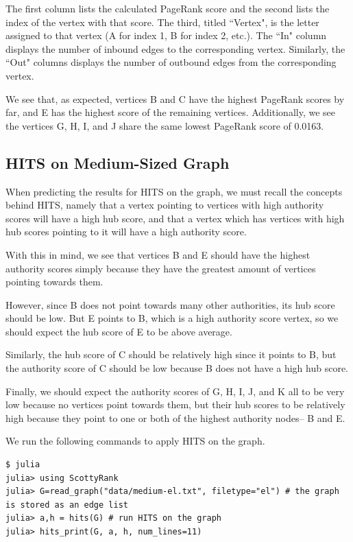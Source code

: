 \documentclass[12pt, titlepage, twoside]{amsart}
\begin{document}
The first column lists the calculated PageRank score and
the second lists the index of the vertex with that score.
The third, titled ``Vertex", is the letter assigned to that vertex (A for index 1, B for index 2, etc.).
The ``In" column displays the number of inbound edges to the corresponding vertex.
Similarly, the ``Out" columns displays the number of outbound edges from the corresponding vertex.

We see that, as expected, vertices B and C have the highest PageRank scores by far,
and E has the highest score of the remaining vertices.
Additionally, we see the vertices G, H, I, and J share the same lowest PageRank score of 0.0163.

\subsection{HITS on Medium-Sized Graph}

When predicting the results for HITS on the graph, we must recall the concepts behind HITS, namely
that a vertex pointing to vertices with high authority scores will have a high hub score,
and that a vertex which has vertices with high hub scores pointing to it will have a high authority score.

With this in mind, we see that vertices B and E should have the highest authority scores
simply because they have the greatest amount of vertices pointing towards them.

However, since B does not point towards many other authorities, its hub score should be low.
But E points to B, which is a high authority score vertex, so we should expect 
the hub score of E to be above average.

Similarly, the hub score of C should be relatively high since it points to B, but the authority score of C should be low because B does not have a high hub score.

Finally, we should expect the authority scores of G, H, I, J, and K all to be very low
because no vertices point towards them,
but their hub scores to be relatively high because they point to
one or both of the highest authority nodes-- B and E.

We run the following commands to apply HITS on the graph.

\begin{verbatim}
$ julia
julia> using ScottyRank
julia> G=read_graph("data/medium-el.txt", filetype="el") # the graph is stored as an edge list
julia> a,h = hits(G) # run HITS on the graph
julia> hits_print(G, a, h, num_lines=11)
\end{verbatim}
\end{document}
